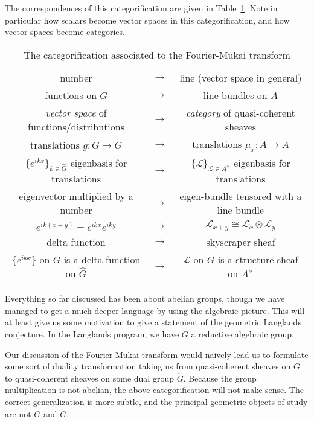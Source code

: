 The correspondences of this categorification are given in Table~\ref{tab:fourier_mukai}. Note in particular how scalars become vector spaces in this categorification, and how vector spaces become categories. 
\begin{table}
	\centering
	\begin{tabular}{c c  c}
		number & $\to$ & line (vector space in general)\\
		functions on $G$ & $\to$ & line bundles on $A$\\
		\emph{vector space} of functions/distributions & $\to$ & \emph{category} of quasi-coherent sheaves\\
		translations $g: G \to G$ & $\to$ & translations $\mu_x: A \to A$\\
		$\{e^{ikx}\}_{k \in \hat G}$ eigenbasis for translations & $\to$ & $
		\{\mathcal L\}_{\mathcal L \in A^\vee}$ eigenbasis for translations\\
		eigenvector multiplied by a number & $\to$ & eigen-bundle tensored with a line bundle\\
		$e^{ik(x+y)} = e^{ikx} e^{iky}$ & $\to$ & $\mathcal L_{x+y} \cong \mathcal L_x \otimes \mathcal L_y$\\
		delta function & $\to$ & skyscraper sheaf\\
		$\{e^{ikx}\}$ on $G$ is a delta function on $\hat G$ & $\to$ & $\mathcal L$ on $G$ is a structure sheaf on $A^\vee$
	\end{tabular}
	\caption{The categorification associated to the Fourier-Mukai transform}
	\label{tab:fourier_mukai}
\end{table}
 
Everything so far discussed has been about abelian groups, though we have managed to get a much deeper language by using the algebraic picture. This will at least give us some motivation to give a statement of the geometric Langlands conjecture. In the Langlands program, we have $G$ a reductive algebraic group. 

Our discussion of the Fourier-Mukai transform would naively lead us to formulate some sort of duality transformation taking us from quasi-coherent sheaves on $G$ to quasi-coherent sheaves on some dual group $\check G$. Because the group multiplication is not abelian, the above categorification will not make sense. The correct generalization is more subtle, and the principal geometric objects of study are not $G$ and $\check G$.

